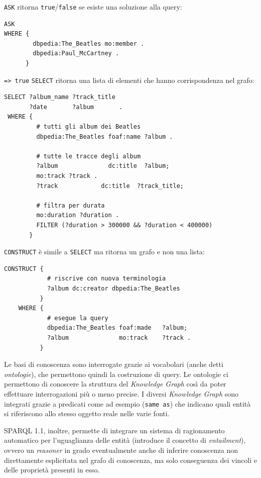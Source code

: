 \documentclass[11pt]{article}
\begin{document}
\verb|ASK| ritorna \verb|true|/\verb|false| se esiste una soluzione alla query:
\begin{lstlisting}[langauge=sparql]
  ASK
WHERE {
        dbpedia:The_Beatles mo:member .
        dbpedia:Paul_McCartney .
      }
\end{lstlisting}
\verb|=> true| \newline
\verb|SELECT| ritorna una lista di elementi che hanno corrispondenza nel grafo:
\begin{lstlisting}[language=sparql]
SELECT ?album_name ?track_title
       ?date       ?album       .
 WHERE {
         # tutti gli album dei Beatles
         dbpedia:The_Beatles foaf:name ?album .

         # tutte le tracce degli album
         ?album              dc:title  ?album;
         mo:track ?track .
         ?track            dc:title  ?track_title;

         # filtra per durata
         mo:duration ?duration .
         FILTER (?duration > 300000 && ?duration < 400000)
       }
\end{lstlisting}

\verb|CONSTRUCT| è simile a \verb|SELECT| ma ritorna un grafo e non una lista:
\begin{lstlisting}[language=sparql]
CONSTRUCT {
            # riscrive con nuova terminologia
            ?album dc:creator dbpedia:The_Beatles
          }
    WHERE {
            # esegue la query
            dbpedia:The_Beatles foaf:made   ?album;
            ?album              mo:track    ?track .
          }
\end{lstlisting}
  
Le basi di conoscenza sono interrogate grazie ai vocabolari (anche detti \textit{ontologie}), che permettono quindi la costruzione di query. Le ontologie ci permettono di conoscere la struttura del \textit{Knowledge Graph} così da poter effettuare interrogazioni più o meno precise. I diversi \textit{Knowledge Graph} sono integrati grazie a predicati come ad esempio (\verb|same as|) che indicano quali entità si riferiscono allo stesso oggetto reale nelle varie fonti.

SPARQL 1.1, inoltre, permette di integrare un sistema di ragionamento automatico per l'uguaglianza delle entità (introduce il concetto di \textit{entailment}), ovvero un \textit{reasoner} in grado eventualmente anche di inferire conoscenza non direttamente esplicitata nel grafo di conoscenza, ma solo conseguenza dei vincoli e delle proprietà presenti in esso.
\end{document}
